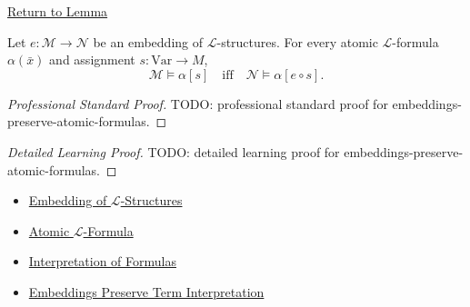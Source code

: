 \newpage
{}
\label{prf:embeddings-preserve-atomic-formulas}

\begin{remark*}[Return]
\hyperref[lem:embeddings-preserve-atomic-formulas]{Return to Lemma}
\end{remark*}

\begin{lemma*}
Let $e\colon\mathcal{M}\to\mathcal{N}$ be an embedding of
$\mathcal{L}$-structures. For every atomic $\mathcal{L}$-formula
$\alpha(\bar x)$ and assignment $s\colon\mathrm{Var}\to M$,
\[
  \mathcal{M}\models \alpha[s]
  \quad\text{iff}\quad
  \mathcal{N}\models \alpha[e\circ s].
\]
\end{lemma*}

\begin{proof}[Professional Standard Proof]
\LRAProofBodyStart
TODO: professional standard proof for embeddings-preserve-atomic-formulas.
\end{proof}

\begin{proof}[Detailed Learning Proof]
\LRAProofBodyStart
TODO: detailed learning proof for embeddings-preserve-atomic-formulas.
\end{proof}

\begin{remark*}
\end{remark*}

\begin{dependencies}
\begin{itemize}
  \item \hyperref[def:l-structure-embedding]{Embedding of $\mathcal{L}$-Structures}
  \item \hyperref[def:l-atomic-formula]{Atomic $\mathcal{L}$-Formula}
  \item \hyperref[def:formula-interpretation]{Interpretation of Formulas}
  \item \hyperref[prop:embeddings-preserve-term-interpretation]{Embeddings Preserve Term Interpretation}
\end{itemize}
\end{dependencies}

\clearpage
